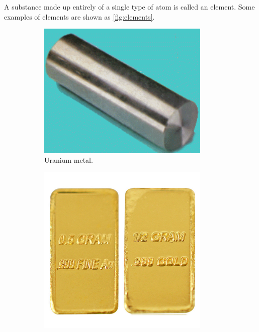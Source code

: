 \documentclass[a4paper]{memoir}
\begin{document}
A substance made up entirely of a single type of atom is called an element. Some examples of elements are shown as \cref{fig:elements}.

\begin{figure}
  \centering
  \begin{subfigure}[t]{0.45\textwidth}
    \centering
    \includegraphics[width=0.9\textwidth]{uranium}
    \caption{Uranium metal.}
  \end{subfigure}%
  \begin{subfigure}[t]{0.45\textwidth}
    \centering
    \includegraphics[width=0.9\textwidth]{gold}

\end{subfigure}
\end{figure}
\end{document}
